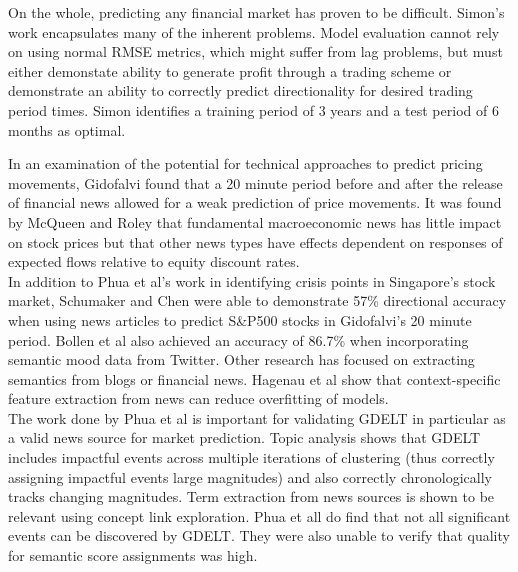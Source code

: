 On the whole, predicting any financial market has proven to be difficult. Simon's work encapsulates many of the inherent problems. Model evaluation cannot rely on using normal RMSE metrics, which might suffer from lag problems, but must either demonstate ability to generate profit through a trading scheme or demonstrate an ability to correctly predict directionality for desired trading period times. Simon identifies a training period of 3 years and a test period of 6 months as optimal.\cite{forex_neuralnets}

\noindent In an examination of the potential for technical approaches to predict pricing movements, Gidofalvi found that a 20 minute period before and after the release of financial news allowed for a weak prediction of price movements.\cite{gidofalvi2001using} It was found by McQueen and Roley that fundamental macroeconomic news has little impact on stock prices but that other news types have effects dependent on responses of expected flows relative to equity discount rates.\cite{mcqueen1993stock}\\

\noindent In addition to Phua et al's work in identifying crisis points in Singapore's stock market, Schumaker and Chen were able to demonstrate 57\% directional accuracy when using news articles to predict S&P500 stocks in Gidofalvi's 20 minute period.\cite{schumaker2009technical} Bollen et al also achieved an accuracy of 86.7\% when incorporating semantic mood data from Twitter.\cite{bollen2011twitter} Other research has focused on extracting semantics from blogs or financial news. Hagenau et al show that context-specific feature extraction from news can reduce overfitting of models.\cite{hagenau2012automated}\\

\noindent The work done by Phua et al is important for validating GDELT in particular as a valid news source for market prediction. Topic analysis shows that GDELT includes impactful events across multiple iterations of clustering (thus correctly assigning impactful events large magnitudes) and also correctly chronologically tracks changing magnitudes. Term extraction from news sources is shown to be relevant using concept link exploration. Phua et all do find that not all significant events can be discovered by GDELT. They were also unable to verify that quality for semantic score assignments was high.